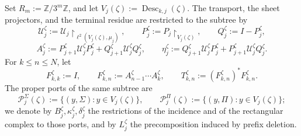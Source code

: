 Set \(R_m:=\mathbb Z/3^m\mathbb Z\), and let
\(V_j(\zeta):=\operatorname{Desc}_{k,j}(\zeta)\). The transport, the
sheet projectors, and the terminal residue are restricted to the subtree by
\[
 \mathcal U_j^\zeta:=
 \mathcal U_j\!\upharpoonright_{\ell^2(V_j(\zeta),\mu_j)},
 \qquad P_j^\zeta:=P_j\!\upharpoonright_{V_j(\zeta)},
 \qquad Q_j^\zeta:=I-P_j^\zeta,
\]
\[
 A_j^\zeta:=P_{j+1}^\zeta\mathcal U_j^\zeta P_j^\zeta
             +Q_{j+1}^\zeta\mathcal U_j^\zeta Q_j^\zeta,
 \qquad
 \eta_j^\zeta:=Q_{j+1}^\zeta\mathcal U_j^\zeta P_j^\zeta
             +P_{j+1}^\zeta\mathcal U_j^\zeta Q_j^\zeta.
\]
For \(k\leq n\leq N\), let
\[
 F_{k,k}^\zeta:=I,
 \qquad
 F_{k,n}^\zeta:=A_{n-1}^\zeta\cdots A_k^\zeta,
 \qquad
 T_{k,n}^\zeta:=(F_{k,n}^\zeta)^*F_{k,n}^\zeta.
\]
The proper ports of the same subtree are
\[
 \mathscr P_j^\Sigma(\zeta):=
 \{(y,\Sigma):y\in V_j(\zeta)\},
 \qquad
 \mathscr P_j^\Pi(\zeta):=
 \{(y,\Pi):y\in V_j(\zeta)\};
\]
we denote by \(B_j^\zeta,\kappa_j^\zeta,\delta_j^\zeta\) the restrictions
of the incidence and of the rectangular complex to those ports, and by
\(L_j^\zeta\) the precomposition induced by prefix deletion.

